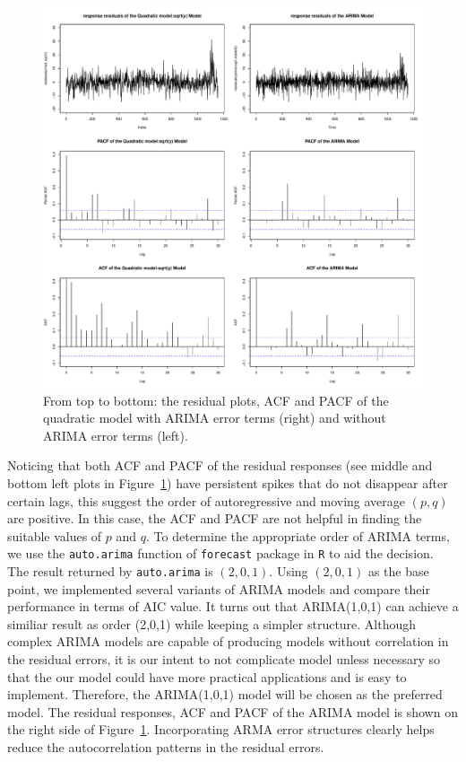 \documentclass [11pt, proquest] {uwthesis}[2015/03/03]
\begin{document}
\begin{figure}
   \includegraphics[width=1\textwidth]{figures/residual_acfpcf} 
  \caption{From top to bottom: the residual plots, ACF and PACF of the quadratic model with ARIMA error terms (right) and without ARIMA error terms (left).}
  \label{fig:residual_acfpcf}
\end{figure}


Noticing that both ACF and PACF of the residual responses (see middle and bottom left plots in Figure~\ref{fig:residual_acfpcf}) have persistent spikes that do not disappear after certain lags, this suggest the order of autoregressive and moving average $(p,q)$ are positive. In this case, the ACF and PACF are not helpful in finding the suitable values of $p$ and $q$. To determine the appropriate order of ARIMA terms, we use the \texttt{auto.arima} function of \texttt{forecast} package in \texttt{R} to aid the decision. The result returned by \texttt{auto.arima} is $(2,0,1)$. Using $(2,0,1)$ as the base point, we implemented several variants of ARIMA models and compare their performance in terms of AIC value. It turns out that ARIMA(1,0,1) can achieve a similiar result as order (2,0,1) while keeping a simpler structure. Although complex ARIMA models are capable of producing models without correlation in the residual errors, it is our intent to not complicate model unless necessary so that the our model could have more practical applications and is easy to implement. Therefore, the ARIMA(1,0,1) model will be chosen as the preferred model. The residual responses, ACF and PACF of the ARIMA model is shown on the right side of Figure~\ref{fig:residual_acfpcf}. Incorporating ARMA error structures clearly helps reduce the autocorrelation patterns in the residual errors.
 
\end{document}
